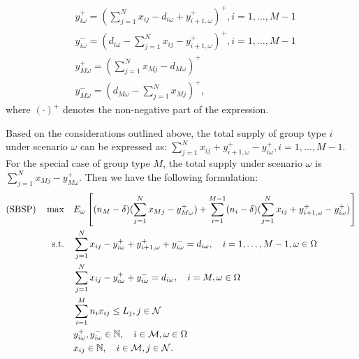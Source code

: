 \begin{equation}\label{y_recursively}
\begin{aligned}
  & y_{i \omega}^{+}= (\sum_{j=1}^N x_{ij}- d_{i \omega} + y_{i+1, \omega}^{+})^{+}, i =1,\ldots, M-1 \\
  & y_{i \omega}^{-}= (d_{i \omega}- \sum_{j=1}^N x_{ij} - y_{i+1, \omega}^{+})^{+}, i =1,\ldots, M-1 \\
  & y_{M \omega}^{+} = (\sum_{j=1}^N x_{Mj} - d_{M \omega})^{+} \\ 
  & y_{M \omega}^{-} = (d_{M \omega}- \sum_{j=1}^N x_{Mj})^{+},
\end{aligned}
\end{equation}
where $(\cdot)^{+}$ denotes the non-negative part of the expression. 

Based on the considerations outlined above, the total supply of group type $i$ under scenario $\omega$ can be expressed as: $\sum_{j= 1}^{N} x_{ij} + y_{i+1,\omega}^{+} - y_{i \omega}^{+}, i = 1, \ldots, M-1$. For the special case of group type $M$, the total supply under scenario $\omega$ is $\sum_{j= 1}^{N} x_{Mj} - y_{M \omega}^{+}$.
Then we have the following formulation:
  \begin{align}
  (\text{SBSP}) \quad \max \quad & E_{\omega}\left[(n_{M}-\delta) (\sum_{j= 1}^{N} x_{Mj} - y_{M \omega}^{+}) + \sum_{i=1}^{M-1} (n_i-\delta) (\sum_{j= 1}^{N} x_{ij} + y_{i+1,\omega}^{+} - y_{i \omega}^{+})\right] \label{obj_sto}\\
  \text {s.t.} \quad & \sum_{j= 1}^{N} x_{ij}-y_{i \omega}^{+}+
  y_{i+1, \omega}^{+} + y_{i \omega}^{-}=d_{i \omega}, \quad i = 1,\ldots, M-1, \omega \in \Omega \label{DEF_constr1} \\
  & \sum_{j= 1}^{N} x_{ij} -y_{i \omega}^{+}+y_{i \omega}^{-}=d_{i \omega}, \quad i = M, \omega \in \Omega \label{DEF_constr2}\\
  & \sum_{i=1}^{M} n_{i} x_{ij} \leq L_j, j \in \mathcal{N}  \label{DEF_constr3} \\
  & y_{i \omega}^{+}, y_{i \omega}^{-} \in \mathbb{N}, \quad i \in \mathcal{M}, \omega \in \Omega \notag \\
  & x_{ij} \in \mathbb{N}, \quad i \in \mathcal{M}, j \in \mathcal{N} \notag.
  \end{align}


